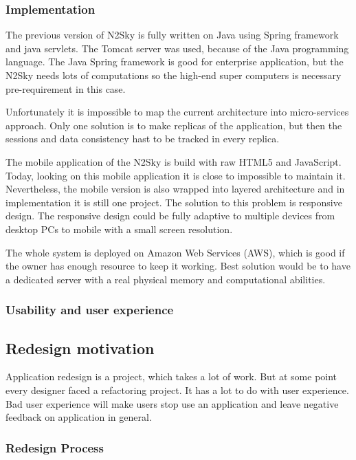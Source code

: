 \subsubsection{Implementation}\label{Implementation}

The previous version of N2Sky is fully written on Java using Spring framework and java servlets. The Tomcat server was used, because of the Java programming language. The  Java Spring framework is good for enterprise application, but the N2Sky needs lots of computations so the  high-end super computers is necessary pre-requirement in this case. 

Unfortunately it is impossible to map the current architecture into micro-services approach. Only one solution is to make replicas of the application, but then the sessions and data consistency hast to be tracked in every replica. 

The mobile application of the N2Sky is build with raw HTML5 and JavaScript. Today, looking on this mobile application it is close to impossible to maintain it. Nevertheless,  the mobile version is also wrapped into layered architecture and in implementation it is still one project. The solution to this problem is responsive design. The responsive design could be fully adaptive to multiple devices from desktop PCs to mobile with a small screen resolution.

The whole system is deployed on Amazon Web Services (AWS), which is good if the owner has enough resource to keep it working. Best solution would be to have a dedicated server with a real physical memory and computational abilities. 


\subsubsection{Usability and user experience}\label{Usabilityanduserexperience}



\subsection{Redesign motivation}\label{Redesignmotivation}

Application redesign is a project, which takes a lot of work. But at some point every designer faced a refactoring project. It has a lot to do with user experience. Bad user experience will make users stop use an application and leave negative feedback on application in general. 

\subsubsection{Redesign Process }\label{Redesign Process}


